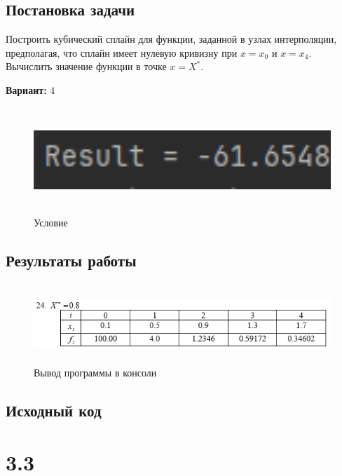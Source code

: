 \subsection{Постановка задачи}
Построить кубический сплайн для функции, заданной в узлах интерполяции, предполагая, что сплайн имеет нулевую кривизну при $x=x_0$  и $x=x_4$. Вычислить значение функции в точке $x=X^*$. 

{\bfseries Вариант:} 4
\begin{figure}[h!]
\centering
\includegraphics[width=15cm, height=4cm]{img/lab3_2_res.png}
\caption{Условие}
\end{figure}

\subsection{Результаты работы}
\begin{figure}[h!]
\centering
\includegraphics[width=15cm, height=3cm]{img/task3_2.png}
\caption{Вывод программы в консоли}
\end{figure}
\pagebreak

\subsection{Исходный код}








\pagebreak

\section* {3.3}

